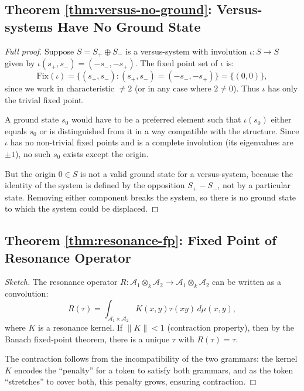 \documentclass[12pt]{article}
\theoremstyle{definition}
\theoremstyle{remark}
\begin{document}
\subsection{Theorem \ref{thm:versus-no-ground}: Versus-systems Have No Ground State}

\begin{proof}[Full proof]
Suppose $S = S_+ \oplus S_-$ is a versus-system with involution $\iota : S \to S$ given by $\iota(s_+, s_-) = (-s_-, -s_+)$. The fixed point set of $\iota$ is:
\[
\text{Fix}(\iota) = \{(s_+, s_-) : (s_+, s_-) = (-s_-, -s_+)\} = \{(0,0)\},
\]
since we work in characteristic $\neq 2$ (or in any case where $2 \neq 0$). Thus $\iota$ has only the trivial fixed point.

A ground state $s_0$ would have to be a preferred element such that $\iota(s_0)$ either equals $s_0$ or is distinguished from it in a way compatible with the structure. Since $\iota$ has no non-trivial fixed points and is a complete involution (its eigenvalues are $\pm 1$), no such $s_0$ exists except the origin.

But the origin $0 \in S$ is not a valid ground state for a versus-system, because the identity of the system is defined by the opposition $S_+ - S_-$, not by a particular state. Removing either component breaks the system, so there is no ground state to which the system could be displaced.
\end{proof}

\subsection{Theorem \ref{thm:resonance-fp}: Fixed Point of Resonance Operator}

\begin{proof}[Sketch]
The resonance operator $R : \mathcal{A}_1 \otimes_k \mathcal{A}_2 \to \mathcal{A}_1 \otimes_k \mathcal{A}_2$ can be written as a convolution:
\[
R(\tau) = \int_{\mathcal{A}_1 \times \mathcal{A}_2} K(x, y) \tau(xy) \, d\mu(x, y),
\]
where $K$ is a resonance kernel. If $\|K\| < 1$ (contraction property), then by the Banach fixed-point theorem, there is a unique $\tau$ with $R(\tau) = \tau$.

The contraction follows from the incompatibility of the two grammars: the kernel $K$ encodes the ``penalty'' for a token to satisfy both grammars, and as the token ``stretches'' to cover both, this penalty grows, ensuring contraction.
\end{proof}
\end{document}
